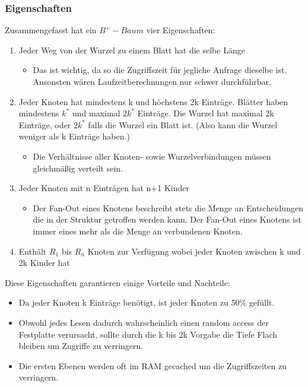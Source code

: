 \documentclass{article}
\begin{document}
	\subsubsection{Eigenschaften}
	Zusammengefasst hat ein $B^+-Baum$ vier Eigenschaften:
	\begin{enumerate}
		\item{Jeder Weg von der Wurzel zu einem Blatt hat die selbe Länge}
		\begin{itemize}
			\item{Das ist wichtig, da so die Zugriffszeit für jegliche Anfrage dieselbe ist. Ansonsten wären Laufzeitberechnungen nur schwer durchführbar.}
		\end{itemize}
		\item{Jeder Knoten hat mindestens k und höchstens 2k Einträge. Blätter haben mindestens $k^*$ und maximal $2k^*$ Einträge. Die Wurzel hat maximal 2k Einträge, oder $2k^*$ falls die Wurzel ein Blatt ist. (Also kann die Wurzel weniger als k Einträge haben.)}
		\begin{itemize}
			\item{Die Verhältnisse aller Knoten- sowie Wurzelverbindungen müssen gleichmäßig verteilt sein.}
		\end{itemize}
		\item{Jeder Knoten mit n Einträgen hat n+1 Kinder}
		\begin{itemize}
			\item{Der Fan-Out eines Knotens beschreibt stets die Menge an Entscheidungen die in der Struktur getroffen werden kann. Der Fan-Out eines Knotens ist immer eines mehr als die Menge an verbundenen Knoten.}
		\end{itemize}
		\item{Enthält $R_1$ bis $R_n$ Knoten zur Verfügung wobei jeder Knoten zwischen k und 2k Kinder hat}
	\end{enumerate}
	Diese Eigenschaften garantieren einige Vorteile und Nachteile:
	\begin{itemize}
		\item{Da jeder Knoten k Einträge benötigt, ist jeder Knoten zu 50\% gefüllt.}
		\item{Obwohl jedes Lesen dadurch wahrscheinlich einen random access der Festplatte verursacht, sollte durch die k bis 2k Vorgabe die Tiefe Flach bleiben um Zugriffe zu verringern.}
		\item{Die ersten Ebenen werden oft im RAM gecached um die Zugriffszeiten zu verringern.}
	\end{itemize}
\end{document}
